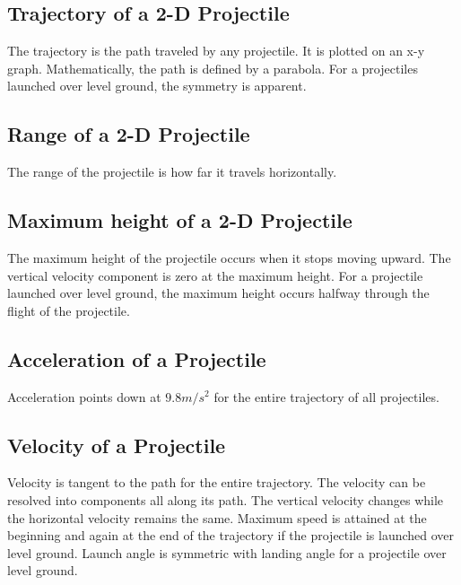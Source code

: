 \subsection{Trajectory of a 2-D Projectile}
The trajectory is the path traveled by any projectile. It is plotted on an x-y graph. Mathematically, the path is defined by a parabola. For a projectiles launched over level ground, the symmetry is apparent.
	
\subsection{Range of a 2-D Projectile}
The range of the projectile is how far it travels horizontally.
	
\subsection{Maximum height of a 2-D Projectile}
The maximum height of the projectile occurs when it stops moving upward. The vertical velocity component is zero at the maximum height. For a projectile launched over level ground, the maximum height occurs halfway through the flight of the projectile. 
	
\subsection{Acceleration of a Projectile}
Acceleration points down at $9.8m/s^2$ for the entire trajectory of all projectiles. 
	
\subsection{Velocity of a Projectile}
Velocity is tangent to the path for the entire trajectory. The velocity can be resolved into components all along its path. The vertical velocity changes while the horizontal velocity remains the same. Maximum speed is attained at the beginning and again at the end of the trajectory if the projectile is launched over level ground. Launch angle is symmetric with landing angle for a projectile over level ground.
	
